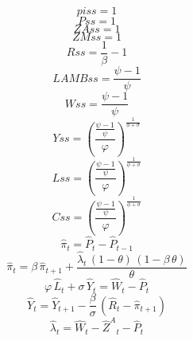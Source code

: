 \begin{dmath*}
piss = 1
\end{dmath*}
\begin{dmath*}
Pss = 1
\end{dmath*}
\begin{dmath*}
ZAss = 1
\end{dmath*}
\begin{dmath*}
ZMss = 1
\end{dmath*}
\begin{dmath*}
Rss = \frac{1}{{{\beta}}}-1
\end{dmath*}
\begin{dmath*}
LAMBss = \frac{{{\psi}}-1}{{{\psi}}}
\end{dmath*}
\begin{dmath*}
Wss = \frac{{{\psi}}-1}{{{\psi}}}
\end{dmath*}
\begin{dmath*}
Yss = \left(\frac{\frac{{{\psi}}-1}{{{\psi}}}}{{{\varphi}}}\right)^{\frac{1}{{{\phi}}+{{\sigma}}}}
\end{dmath*}
\begin{dmath*}
Lss = \left(\frac{\frac{{{\psi}}-1}{{{\psi}}}}{{{\varphi}}}\right)^{\frac{1}{{{\phi}}+{{\sigma}}}}
\end{dmath*}
\begin{dmath*}
Css = \left(\frac{\frac{{{\psi}}-1}{{{\psi}}}}{{{\varphi}}}\right)^{\frac{1}{{{\phi}}+{{\sigma}}}}
\end{dmath*}
\begin{dmath}
{{\hat{\pi}}}_{t}={{\hat{P}}}_{t}-{{\hat{P}}}_{t-1}
\end{dmath}
\begin{dmath}
{{\hat{\pi}}}_{t}={{\beta}}\, {{\hat{\pi}}}_{t+1}+\frac{{{\hat{\lambda}}}_{t}\, \left(1-{{\theta}}\right)\, \left(1-{{\beta}}\, {{\theta}}\right)}{{{\theta}}}
\end{dmath}
\begin{dmath}
{{\varphi}}\, {{\hat{L}}}_{t}+{{\sigma}}\, {{\hat{Y}}}_{t}={{\hat{W}}}_{t}-{{\hat{P}}}_{t}
\end{dmath}
\begin{dmath}
{{\hat{Y}}}_{t}={{\hat{Y}}}_{t+1}-\frac{{{\beta}}}{{{\sigma}}}\, \left({{\hat{R}}}_{t}-{{\hat{\pi}}}_{t+1}\right)
\end{dmath}
\begin{dmath}
{{\hat{\lambda}}}_{t}={{\hat{W}}}_{t}-{{\hat{Z}^A}}_{t}-{{\hat{P}}}_{t}
\end{dmath}
